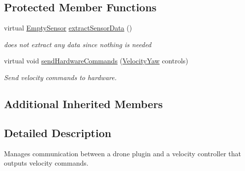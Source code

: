 \subsection*{Protected Member Functions}
\begin{DoxyCompactItemize}
\item 
virtual \hyperlink{structEmptySensor}{Empty\-Sensor} \hyperlink{classBuiltInVelocityControllerDroneConnector_af69ba169f039d9f8d59f675392af4cf0}{extract\-Sensor\-Data} ()
\begin{DoxyCompactList}\small\item\em does not extract any data since nothing is needed \end{DoxyCompactList}\item 
virtual void \hyperlink{classBuiltInVelocityControllerDroneConnector_a10a06a14a9a34afbe37c79e86ffd5787}{send\-Hardware\-Commands} (\hyperlink{structVelocityYaw}{Velocity\-Yaw} controls)
\begin{DoxyCompactList}\small\item\em Send velocity commands to hardware. \end{DoxyCompactList}\end{DoxyCompactItemize}
\subsection*{Additional Inherited Members}


\subsection{Detailed Description}
Manages communication between a drone plugin and a velocity controller that outputs velocity commands. 

